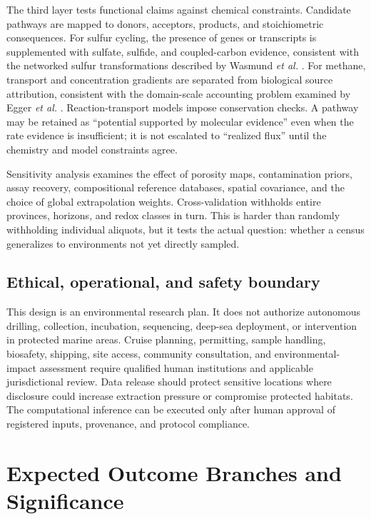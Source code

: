 \documentclass[conference]{../../../../Conference-LaTeX-template_10-17-19/IEEEtran}
\begin{document}
The third layer tests functional claims against chemical constraints. Candidate pathways are mapped to donors, acceptors, products, and stoichiometric consequences. For sulfur cycling, the presence of genes or transcripts is supplemented with sulfate, sulfide, and coupled-carbon evidence, consistent with the networked sulfur transformations described by Wasmund \textit{et al.} \cite{wasmund2017}. For methane, transport and concentration gradients are separated from biological source attribution, consistent with the domain-scale accounting problem examined by Egger \textit{et al.} \cite{egger2018}. Reaction-transport models impose conservation checks. A pathway may be retained as ``potential supported by molecular evidence'' even when the rate evidence is insufficient; it is not escalated to ``realized flux'' until the chemistry and model constraints agree.

Sensitivity analysis examines the effect of porosity maps, contamination priors, assay recovery, compositional reference databases, spatial covariance, and the choice of global extrapolation weights. Cross-validation withholds entire provinces, horizons, and redox classes in turn. This is harder than randomly withholding individual aliquots, but it tests the actual question: whether a census generalizes to environments not yet directly sampled.

\subsection{Ethical, operational, and safety boundary}
This design is an environmental research plan. It does not authorize autonomous drilling, collection, incubation, sequencing, deep-sea deployment, or intervention in protected marine areas. Cruise planning, permitting, sample handling, biosafety, shipping, site access, community consultation, and environmental-impact assessment require qualified human institutions and applicable jurisdictional review. Data release should protect sensitive locations where disclosure could increase extraction pressure or compromise protected habitats. The computational inference can be executed only after human approval of registered inputs, provenance, and protocol compliance.

\section{Expected Outcome Branches and Significance}
\end{document}
